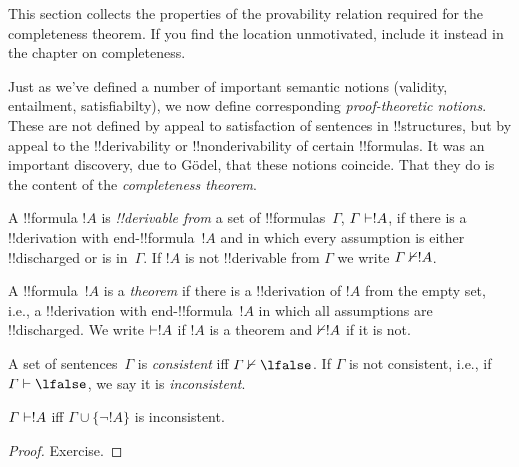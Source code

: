 \documentclass[../../../include/open-logic-section]{subfiles}
\begin{document}

\begin{editorial}
This section collects the properties of the provability relation
required for the completeness theorem.  If you find the location
unmotivated, include it instead in the chapter on completeness.
\end{editorial}

\begin{explain}
Just as we've defined a number of important semantic notions
(validity, entailment, satisfiabilty), we now define corresponding
\emph{proof-theoretic notions}.  These are not defined by appeal to
satisfaction of sentences in !!{structure}s, but by appeal to the
!!{derivability} or !!{nonderivability} of certain !!{formula}s.  It was
an important discovery, due to G\"odel, that these notions coincide.
That they do is the content of the \emph{completeness theorem}.
\end{explain}

\begin{defn}[!!^{derivability}]
A !!{formula} $!A$ is \emph{!!{derivable} from} a set of
!!{formula}s~$\Gamma$, $\Gamma \Proves !A$, if there is a
!!{derivation} with end-!!{formula}~$!A$ and in which every assumption
is either !!{discharged} or is in~$\Gamma$. If $!A$ is not
!!{derivable} from $\Gamma$ we write $\Gamma \Proves/ !A$.
\end{defn}

\begin{defn}[Theorems]
A !!{formula}~$!A$ is a \emph{theorem} if there is a !!{derivation} of
$!A$ from the empty set, i.e., a !!{derivation} with
end-!!{formula}~$!A$ in which all assumptions are !!{discharged}.  We
write $\Proves !A$ if $!A$ is a theorem and $\Proves/ !A$ if it is
not.
\end{defn}

\begin{defn}[Consistency]
A set of sentences~$\Gamma$ is \emph{consistent} iff $\Gamma
\Proves/ \lfalse$.  If $\Gamma$ is not consistent, i.e., if
$\Gamma \Proves \lfalse$, we say it is \emph{inconsistent}.
\end{defn}

\begin{prop}
$\Gamma \Proves !A$ iff $\Gamma \cup \{\lnot !A\}$ is inconsistent.
\end{prop}

\begin{proof}
Exercise.
\end{proof}
\end{document}
